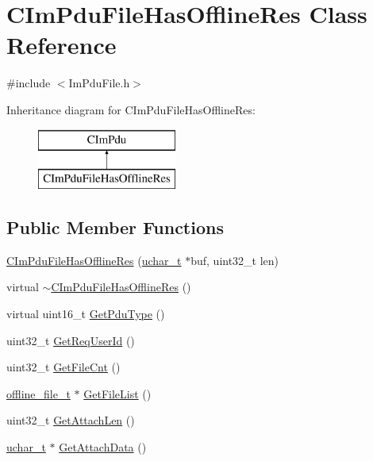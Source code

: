 \hypertarget{class_c_im_pdu_file_has_offline_res}{}\section{C\+Im\+Pdu\+File\+Has\+Offline\+Res Class Reference}
\label{class_c_im_pdu_file_has_offline_res}


{\ttfamily \#include $<$Im\+Pdu\+File.\+h$>$}

Inheritance diagram for C\+Im\+Pdu\+File\+Has\+Offline\+Res\+:\begin{figure}[H]
\begin{center}
\leavevmode
\includegraphics[height=2.000000cm]{class_c_im_pdu_file_has_offline_res}
\end{center}
\end{figure}
\subsection*{Public Member Functions}
\begin{DoxyCompactItemize}
\item 
\hyperlink{class_c_im_pdu_file_has_offline_res_ae26b321c34086b344686903401c159a7}{C\+Im\+Pdu\+File\+Has\+Offline\+Res} (\hyperlink{base_2ostype_8h_a124ea0f8f4a23a0a286b5582137f0b8d}{uchar\+\_\+t} $\ast$buf, uint32\+\_\+t len)
\item 
virtual \hyperlink{class_c_im_pdu_file_has_offline_res_a4e84767adc9d8a98285b28d92a101546}{$\sim$\+C\+Im\+Pdu\+File\+Has\+Offline\+Res} ()
\item 
virtual uint16\+\_\+t \hyperlink{class_c_im_pdu_file_has_offline_res_a8ca77a28802c9855ba77fb76ba11b6a2}{Get\+Pdu\+Type} ()
\item 
uint32\+\_\+t \hyperlink{class_c_im_pdu_file_has_offline_res_ab4bc69f806d3a07215c5eee0e1809409}{Get\+Req\+User\+Id} ()
\item 
uint32\+\_\+t \hyperlink{class_c_im_pdu_file_has_offline_res_abc405979661d1961ab3fca607efb6a96}{Get\+File\+Cnt} ()
\item 
\hyperlink{structoffline__file__t}{offline\+\_\+file\+\_\+t} $\ast$ \hyperlink{class_c_im_pdu_file_has_offline_res_ada6458ada948fb9df9c5aec76e80d155}{Get\+File\+List} ()
\item 
uint32\+\_\+t \hyperlink{class_c_im_pdu_file_has_offline_res_a5cf299c45250e2c984bd1f218757d05d}{Get\+Attach\+Len} ()
\item 
\hyperlink{base_2ostype_8h_a124ea0f8f4a23a0a286b5582137f0b8d}{uchar\+\_\+t} $\ast$ \hyperlink{class_c_im_pdu_file_has_offline_res_a539eefec9bcf327efd0759d9a0421a49}{Get\+Attach\+Data} ()
\end{DoxyCompactItemize}
